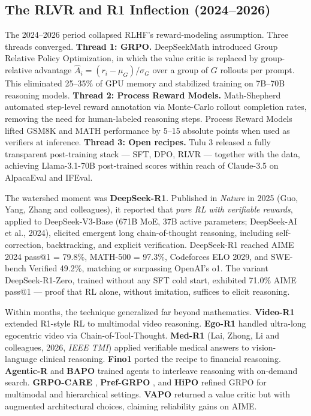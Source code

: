 \documentclass{article}
\begin{document}
\subsection{The RLVR and R1 Inflection (2024--2026)}\label{the-rlvr-and-r1-inflection-20242026}

The 2024--2026 period collapsed RLHF's reward-modeling assumption. Three threads converged. \textbf{Thread 1: GRPO.} DeepSeekMath \citep{shao20242024} introduced Group Relative Policy Optimization, in which the value critic is replaced by group-relative advantage \(\hat A_i = (r_i - \mu_G) / \sigma_G\) over a group of \(G\) rollouts per prompt. This eliminated 25--35\% of GPU memory and stabilized training on 7B--70B reasoning models. \textbf{Thread 2: Process Reward Models.} Math-Shepherd \citep{wang20242024} automated step-level reward annotation via Monte-Carlo rollout completion rates, removing the need for human-labeled reasoning steps. Process Reward Models lifted GSM8K and MATH performance by 5--15 absolute points when used as verifiers at inference. \textbf{Thread 3: Open recipes.} Tulu 3 \citep{lambert20242024} released a fully transparent post-training stack --- SFT, DPO, RLVR --- together with the data, achieving Llama-3.1-70B post-trained scores within reach of Claude-3.5 on AlpacaEval and IFEval.

The watershed moment was \textbf{DeepSeek-R1}. Published in \emph{Nature} in 2025 (Guo, Yang, Zhang and colleagues), it reported that \emph{pure RL with verifiable rewards}, applied to DeepSeek-V3-Base (671B MoE, 37B active parameters; DeepSeek-AI et al., 2024), elicited emergent long chain-of-thought reasoning, including self-correction, backtracking, and explicit verification. DeepSeek-R1 reached AIME 2024 pass@1 = 79.8\%, MATH-500 = 97.3\%, Codeforces ELO 2029, and SWE-bench Verified 49.2\%, matching or surpassing OpenAI's o1. The variant DeepSeek-R1-Zero, trained without any SFT cold start, exhibited 71.0\% AIME pass@1 --- proof that RL alone, without imitation, suffices to elicit reasoning.

Within months, the technique generalized far beyond mathematics. \textbf{Video-R1} \citep{feng20252025} extended R1-style RL to multimodal video reasoning. \textbf{Ego-R1} \citep{tian20252025} handled ultra-long egocentric video via Chain-of-Tool-Thought. \textbf{Med-R1} (Lai, Zhong, Li and colleagues, 2026, \emph{IEEE TMI}) applied verifiable medical answers to vision-language clinical reasoning. \textbf{Fino1} \citep{qian20252025} ported the recipe to financial reasoning. \textbf{Agentic-R} \citep{liu20262026} and \textbf{BAPO} \citep{liu20262026} trained agents to interleave reasoning with on-demand search. \textbf{GRPO-CARE} \citep{chen20252025}, \textbf{Pref-GRPO} \citep{wang20252025}, and \textbf{HiPO} \citep{kachroo20262026} refined GRPO for multimodal and hierarchical settings. \textbf{VAPO} \citep{yu20252025} returned a value critic but with augmented architectural choices, claiming reliability gains on AIME.
\end{document}
